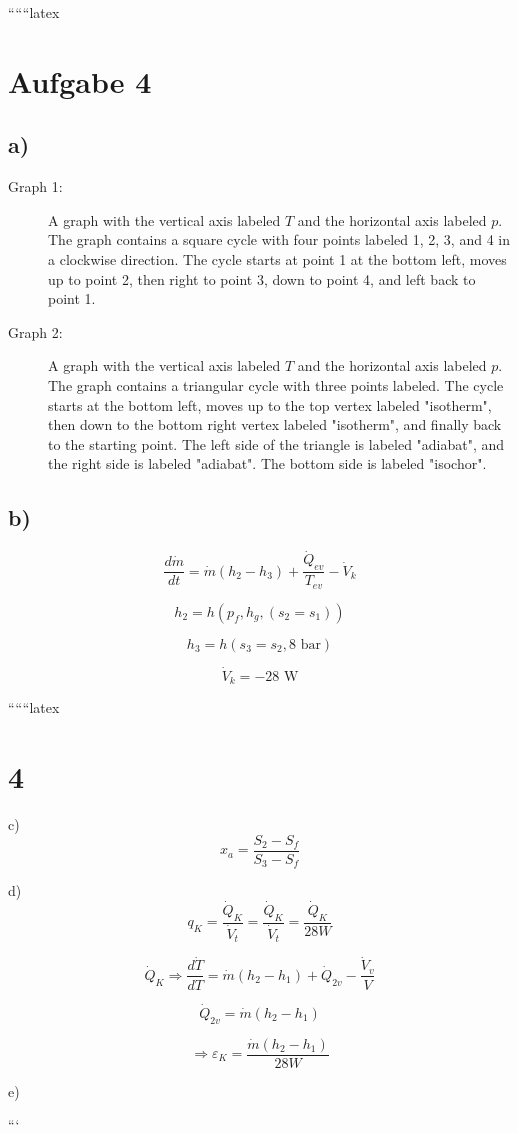 
``````latex


\section*{Aufgabe 4}

\subsection*{a)}

\begin{description}
    \item[Graph 1:] A graph with the vertical axis labeled \( T \) and the horizontal axis labeled \( p \). The graph contains a square cycle with four points labeled 1, 2, 3, and 4 in a clockwise direction. The cycle starts at point 1 at the bottom left, moves up to point 2, then right to point 3, down to point 4, and left back to point 1.
\end{description}

\begin{description}
    \item[Graph 2:] A graph with the vertical axis labeled \( T \) and the horizontal axis labeled \( p \). The graph contains a triangular cycle with three points labeled. The cycle starts at the bottom left, moves up to the top vertex labeled "isotherm", then down to the bottom right vertex labeled "isotherm", and finally back to the starting point. The left side of the triangle is labeled "adiabat", and the right side is labeled "adiabat". The bottom side is labeled "isochor".
\end{description}

\subsection*{b)}

\[
\frac{d\dot{m}}{dt} = \dot{m} (h_2 - h_3) + \frac{\dot{Q}_{ev}}{T_{ev}} - \dot{V}_k
\]

\[
h_2 = h(p_f, h_g, (s_2 = s_1))
\]

\[
h_3 = h(s_3 = s_2, 8 \text{ bar})
\]

\[
\dot{V}_k = -28 \text{ W}
\]

``````latex

\section*{4}

c) \[ x_a = \frac{S_2 - S_f}{S_3 - S_f} \]

d) \[ q_K = \frac{\dot{Q}_K}{\dot{V}_t} = \frac{\dot{Q}_K}{\dot{V}_t} = \frac{\dot{Q}_K}{28W} \]

\[
\dot{Q}_K \Rightarrow \frac{d\dot{T}}{dT} = \dot{m}(h_2 - h_1) + \dot{Q}_{2v} - \frac{\dot{V}_v}{V}
\]

\[
\dot{Q}_{2v} = \dot{m}(h_2 - h_1)
\]

\[
\Rightarrow \varepsilon_K = \frac{\dot{m}(h_2 - h_1)}{28W}
\]

e)

```